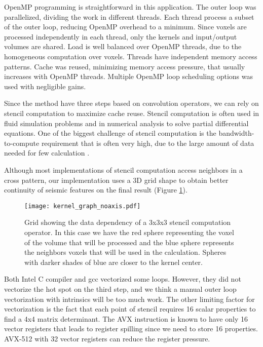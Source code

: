 \documentclass[conference]{IEEEtran}
\begin{document}
OpenMP programming is straightforward in this application. The outer loop was parallelized, dividing the work in different threads. Each thread process a subset of the outer loop, reducing OpenMP overhead to a minimum. Since voxels are processed independently in each thread, only the kernels and input/output volumes are shared. Load is well balanced over OpenMP threads, due to the homogeneous computation over voxels. Threads have independent memory access patterns. Cache was reused, minimizing memory access pressure, that usually increases with OpenMP threads. Multiple OpenMP loop scheduling options was used with negligible gains.

Since the method have three steps based on convolution operators, we can rely on stencil computation  \cite{dursun} to maximize cache reuse. Stencil computation is often used in fluid simulation problems and in numerical analysis to solve partial differential equations. One of the biggest challenge of stencil computation is the bandwidth-to-compute requirement that is often very high, due to the large amount of data needed for few calculation \cite{nguyen}.

Although most implementations of stencil computation access neighbors  in a cross pattern, our implementation uses a 3D grid shape to obtain better continuity of seismic features on the final result (Figure \ref{fig:kernel}).

\begin{figure}[h!]
  \centering
  \texttt{[image: kernel\_graph\_noaxis.pdf]}
  \caption{ Grid showing the data dependency of a 3x3x3 stencil computation operator.
  In this case we have the red sphere representing the voxel of the volume that will be processed and
  the blue sphere represents the neighbors voxels that will be used in the calculation.
  Spheres with darker shades of blue are closer to the kernel center. }
  \label{fig:kernel}
\end{figure}

Both Intel C compiler and gcc vectorized some loops. However, they did not vectorize the hot spot on the third step, and we think a manual outer loop vectorization with intrinsics will be too much work. The other limiting factor for vectorization is the fact that each point of stencil requires 16 scalar properties to find a 4x4 matrix determinant. The AVX instruction is known to have only 16 vector registers that leads to register spilling since we need to store 16 properties. AVX-512 \cite{avx} with 32 vector registers can reduce the register pressure.
\end{document}

